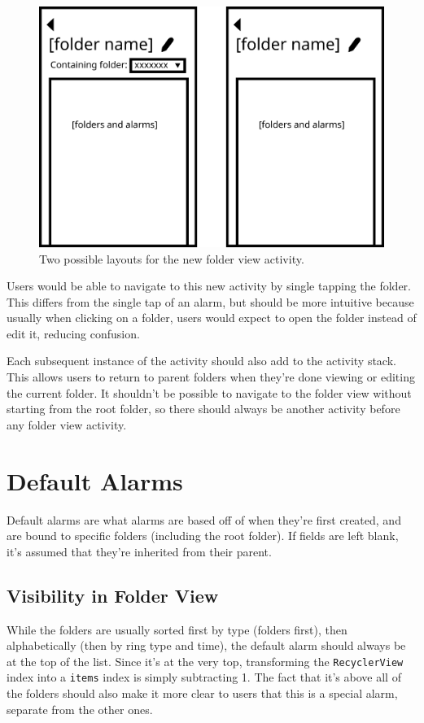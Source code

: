 \documentclass[11pt]{article} %
\begin{document}
\begin{figure}[h]
	\centering
	\includegraphics[scale=0.5]{possible folder view layout.png}
	\caption{Two possible layouts for the new folder view activity.}
\end{figure}

Users would be able to navigate to this new activity by single tapping the folder. This differs from the single tap of an alarm, but should be more intuitive because usually when clicking on a folder, users would expect to open the folder instead of edit it, reducing confusion. 

Each subsequent instance of the activity should also add to the activity stack. This allows users to return to parent folders when they're done viewing or editing the current folder. It shouldn't be possible to navigate to the folder view without starting from the root folder, so there should always be another activity before any folder view activity. 

\section{Default Alarms}
\label{sec:defaultAlarms}
Default alarms are what alarms are based off of when they're first created, and are bound to specific folders (including the root folder). If fields are left blank, it's assumed that they're inherited from their parent.

\subsection{Visibility in Folder View}
While the folders are usually sorted first by type (folders first), then alphabetically (then by ring type and time), the default alarm should always be at the top of the list. Since it's at the very top, transforming the \verb|RecyclerView| index into a \verb|items| index is simply subtracting 1. The fact that it's above all of the folders should also make it more clear to users that this is a special alarm, separate from the other ones.
\end{document}

